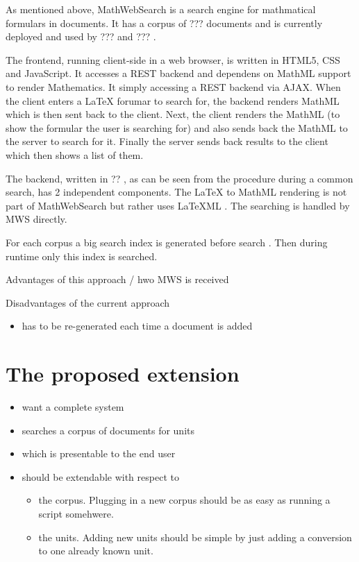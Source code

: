 \documentclass[11pt]{article}
\begin{document}
As mentioned above, MathWebSearch is a search engine for mathmatical formulars in documents. It has a corpus of ???  documents and is currently deployed and used by ??? and ??? .

The frontend, running client-side in a web browser, is written in HTML5, CSS and JavaScript. It accesses a REST backend and dependens on MathML support to render Mathematics. It simply accessing a REST backend via AJAX. When the client enters a LaTeX forumar to search for, the backend renders MathML which is then sent back to the client. Next, the client renders the MathML (to show the formular the user is searching for) and also sends back the MathML to the server to search for it. Finally the server sends back results to the client which then shows a list of them.

The backend, written in ?? , as can be seen from the procedure during a common search, has 2 independent components. The LaTeX to MathML rendering is not part of MathWebSearch but rather uses LaTeXML . The searching is handled by MWS directly.

For each corpus a big search index is generated before search . Then during runtime only this index is searched. 


Advantages of this approach / hwo MWS is received

Disadvantages of the current approach
\begin{itemize}
  \item has to be re-generated each time a document is added
\end{itemize}

\section{The proposed extension}
\label{sec:extension}

\begin{itemize}
  \item want a complete system
  \item searches a corpus of documents for units
  \item which is presentable to the end user
  \item should be extendable with respect to
  \begin{itemize}
    \item the corpus. Plugging in a new corpus should be as easy as running a script somehwere.
    \item the units. Adding new units should be simple by just adding a conversion to one already known unit.
  \end{itemize}
\end{itemize}
\end{document}
